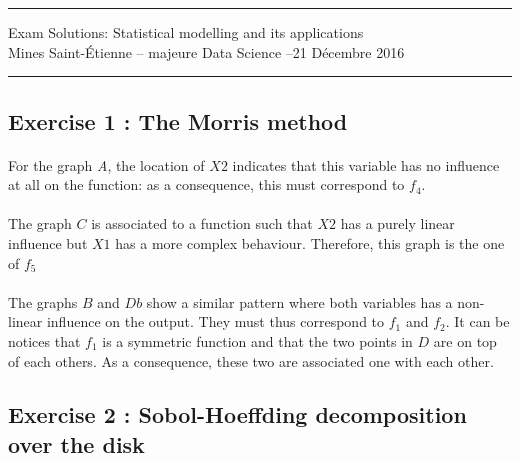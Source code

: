 \documentclass[a4paper,10pt]{article}
\begin{document}
\begin{center}
\hrule \vspace{3mm}
	{\Large Exam Solutions: Statistical modelling and its applications}\\ \vspace{3mm}
	{Mines Saint-\'Etienne -- majeure Data Science --21 Décembre 2016} \\ \vspace{3mm}
	\hrule
\end{center}
\vspace{5mm}

\subsection*{Exercise 1 : The Morris method} 

\paragraph{}
For the graph \emph{A}, the location of $X2$ indicates that this variable has no influence at all on the function: as a consequence, this must correspond to $f_4$.

\paragraph{}
The graph $C$ is associated to a function such that $X2$ has a purely linear influence but $X1$ has a more complex behaviour. Therefore, this graph is the one of $f_5$

\paragraph{}
The graphs $B$ and $Db$ show a similar pattern where both variables has a non-linear influence on the output. They must thus correspond to $f_1$ and $f_2$. It can be notices that $f_1$ is a symmetric function and that the two points in $D$ are on top of each others. As a consequence, these two are associated one with each other.

\subsection*{Exercise 2 : Sobol-Hoeffding decomposition over the disk}
\end{document}
